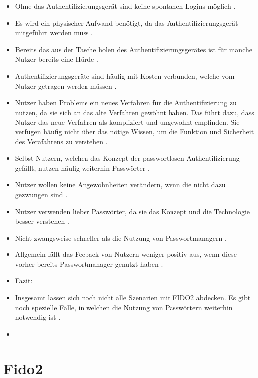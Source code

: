 \begin{itemize}
    \item Ohne das Authentifizierungsgerät sind keine spontanen Logins möglich \cite{lyastani2020fido2}.
    \item Es wird ein physischer Aufwand benötigt, da das Authentifizierungsgerät mitgeführt werden muss \cite{lyastani2020fido2}.
    \item Bereits das aus der Tasche holen des Authentifizierungsgerätes ist für manche Nutzer bereits eine Hürde \cite{farke2020you}.
    \item Authentifizierungsgeräte sind häufig mit Kosten verbunden, welche vom Nutzer getragen werden müssen \cite{lyastani2020fido2}.
    \item Nutzer haben Probleme ein neues Verfahren für die Authentifizierung zu nutzen, da sie sich an das alte Verfahren gewöhnt haben. Das führt dazu, dass Nutzer das neue Verfahren als kompliziert und ungewohnt empfinden. Sie verfügen häufig nicht über das nötige Wissen, um die Funktion und Sicherheit des Verafahrens zu verstehen \cite{lyastani2020fido2}.
    \item Selbst Nutzern, welchen das Konzept der passwortlosen Authentifizierung gefällt, nutzen häufig weiterhin Passwörter \cite{farke2020you}.
    \item Nutzer wollen keine Angewohnheiten verändern, wenn die nicht dazu gezwungen sind \cite{farke2020you}.
    \item Nutzer verwenden lieber Passwörter, da sie das Konzept und die Technologie besser verstehen \cite{lyastani2020fido2}.
    \item Nicht zwangsweise schneller als die Nutzung von Passwortmanagern \cite{farke2020you}.
    \item Allgemein fällt das Feeback von Nutzern weniger positiv aus, wenn diese vorher bereits Passwortmanager genutzt haben \cite{farke2020you}.
    \item Fazit:
    \item Insgesamt lassen sich noch nicht alle Szenarien mit FIDO2 abdecken. Es gibt noch spezielle Fälle, in welchen die Nutzung von Passwörtern weiterhin notwendig ist \cite{lyastani2020fido2}.
    \item 
\end{itemize}

\section{Fido2} \label{fido2}

